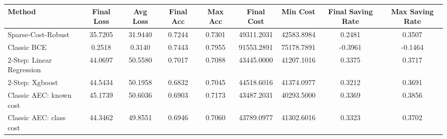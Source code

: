 \begin{tabular}{lcccccccc}
\toprule
Method & Final Loss & Avg Loss & Final Acc & Max Acc & Final Cost & Min Cost & Final Saving Rate & Max Saving Rate \\
\midrule
Sparse-Cost-Robust & 35.7205 & 31.9440 & 0.7244 & 0.7301 & 49311.2031 & 42583.8984 & 0.2481 & 0.3507 \\
Classic BCE & 0.2518 & 0.3140 & 0.7443 & 0.7955 & 91553.2891 & 75178.7891 & -0.3961 & -0.1464 \\
2-Step: Linear Regression & 44.0697 & 50.5580 & 0.7017 & 0.7088 & 43445.0000 & 41207.1016 & 0.3375 & 0.3717 \\
2-Step: Xgboost & 44.5434 & 50.1958 & 0.6832 & 0.7045 & 44518.6016 & 41374.0977 & 0.3212 & 0.3691 \\
Classic AEC: known cost & 45.1739 & 50.6036 & 0.6903 & 0.7173 & 43487.2031 & 40293.5000 & 0.3369 & 0.3856 \\
Classic AEC: class cost & 44.3462 & 49.8551 & 0.6946 & 0.7060 & 43789.0977 & 41302.6016 & 0.3323 & 0.3702 \\
\bottomrule
\end{tabular}
